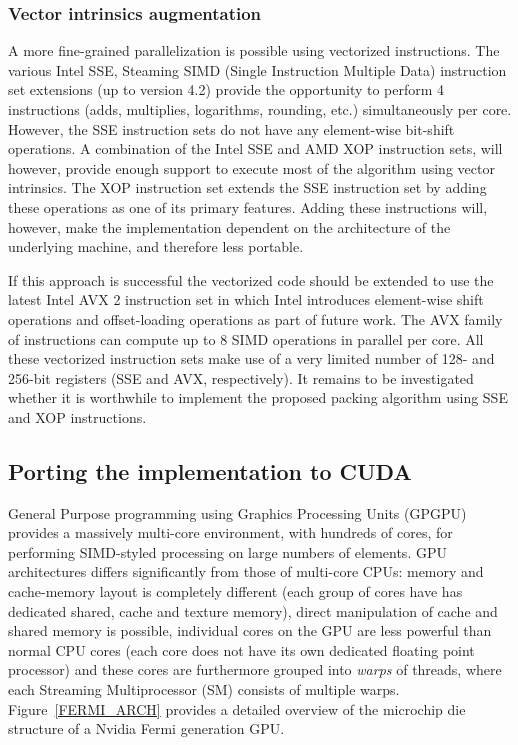  \subsubsection{Vector intrinsics augmentation}
 A more fine-grained parallelization is possible using vectorized instructions. The various Intel SSE, Steaming SIMD (Single Instruction Multiple Data) instruction set extensions (up to version 4.2) provide
 the opportunity to perform 4 instructions (adds, multiplies, logarithms, rounding, etc.) simultaneously per core. However, the SSE instruction sets do not have any element-wise bit-shift operations. A combination 
 of the Intel SSE and AMD XOP instruction sets, will however, provide enough support to execute most of the algorithm using vector intrinsics. The XOP instruction set extends the SSE instruction set by adding these 
 operations as one of its primary features. Adding these instructions will, however, make the implementation dependent on the architecture of the underlying machine, and therefore less portable. 
 
 If this approach is successful the vectorized code should be extended to use the latest Intel AVX 2 instruction set in which Intel introduces element-wise shift operations and offset-loading operations as part of 
 future work. The AVX family of instructions can compute up to 8 SIMD operations in parallel per core. All these vectorized instruction sets make use of a very limited number of 128- and 256-bit registers (SSE and 
 AVX, respectively). It remains to be investigated whether it is worthwhile to implement the proposed packing algorithm using SSE and XOP instructions.
\subsection{Porting the implementation to CUDA}
General Purpose programming using Graphics Processing Units (GPGPU) provides a massively multi-core environment, with hundreds of cores, for performing SIMD-styled 
processing on large numbers of elements. GPU architectures differs significantly from those of multi-core CPUs: memory and cache-memory layout is completely different (each group of cores have 
has dedicated shared, cache and texture memory), direct manipulation of cache and shared memory is possible, individual cores on the GPU are less powerful than normal CPU cores (each core does not have its own dedicated floating point 
processor) and these cores are furthermore grouped into \textit{warps} of threads, where each Streaming Multiprocessor (SM) consists of multiple warps. Figure~\ref{FERMI_ARCH} provides a detailed overview of the microchip die structure of a Nvidia Fermi generation GPU.

